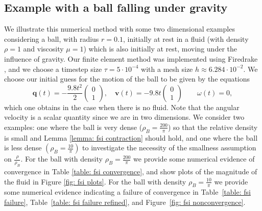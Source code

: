 \documentclass[a4paper]{amsart}
\numberwithin{equation}{section}
\theoremstyle{plain}
\newcommand{\mbf}[1]{\mathbf{#1}}
\begin{document}
\subsection{Example with a ball falling under gravity}
We illustrate this numerical method with some two dimensional examples considering a ball, with radius $r = 0.1$, initially at rest in a fluid (with density $\rho = 1$ and viscosity $\mu = 1$) which is also initially at rest, moving under the influence of gravity.
Our finite element method was implemented using Firedrake \cite{rathgeber2016firedrake}, and we choose a timestep size $\tau = 5 \cdot 10^{-4}$ with a mesh size $h \approx 6.284 \cdot 10^{-2}$.
We choose our initial guess for the motion of the ball to be given by the equations
\[ \mbf{q}(t) = -\frac{9.8t^2}{2}\begin{pmatrix}
    0\\
    1
\end{pmatrix},
\quad 
\mbf{v}(t) = -9.8t\begin{pmatrix}
    0\\
    1
\end{pmatrix} \qquad \omega(t) = 0, \]
which one obtains in the case when there is no fluid.
Note that the angular velocity is a scalar quantity since we are in two dimensions.
We consider two examples: one where the ball is very dense ($\rho_B=\frac{200}{\pi}$) so that the relative density is small and Lemma \ref{lemma: fsi contraction} should hold, and one where the ball is less dense $(\rho_B = \frac{10}{\pi})$ to investigate the necessity of the smallness assumption on $\frac{\rho}{\rho_B}$.
For the ball with density $\rho_B = \frac{200}{\pi}$ we provide some numerical evidence of convergence in Table \ref{table: fsi convergence}, and show plots of the magnitude of the fluid in Figure \ref{fig: fsi plots}.
For the ball with density $\rho_B = \frac{10}{\pi}$ we provide some numerical evidence indicating a failure of convergence in Table~\ref{table: fsi failure}, Table~\ref{table: fsi failure refined}, and Figure~\ref{fig: fsi nonconvergence}.
\end{document}
